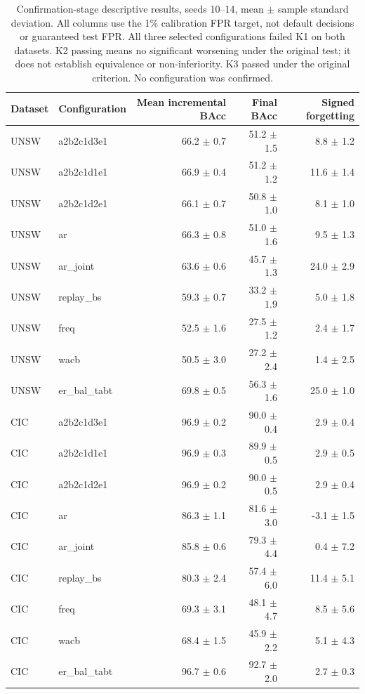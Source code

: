 \begin{table}[p]\centering\scriptsize
\caption{Confirmation-stage descriptive results, seeds 10--14, mean $\pm$ sample standard deviation. All columns use the 1\% calibration FPR target, not default decisions or guaranteed test FPR. All three selected configurations failed K1 on both datasets. K2 passing means no significant worsening under the original test; it does not establish equivalence or non-inferiority. K3 passed under the original criterion. No configuration was confirmed.}
\label{tab:design-space-confirm}
\begin{tabular}{llrrr}\toprule
Dataset & Configuration & Mean incremental BAcc & Final BAcc & Signed forgetting \\\midrule
UNSW & a2b2c1d3e1 & 66.2 $\pm$ 0.7 & 51.2 $\pm$ 1.5 & 8.8 $\pm$ 1.2 \\
UNSW & a2b2c1d1e1 & 66.9 $\pm$ 0.4 & 51.2 $\pm$ 1.2 & 11.6 $\pm$ 1.4 \\
UNSW & a2b2c1d2e1 & 66.1 $\pm$ 0.7 & 50.8 $\pm$ 1.0 & 8.1 $\pm$ 1.0 \\
UNSW & ar & 66.3 $\pm$ 0.8 & 51.0 $\pm$ 1.6 & 9.5 $\pm$ 1.3 \\
UNSW & ar\_joint & 63.6 $\pm$ 0.6 & 45.7 $\pm$ 1.3 & 24.0 $\pm$ 2.9 \\
UNSW & replay\_bs & 59.3 $\pm$ 0.7 & 33.2 $\pm$ 1.9 & 5.0 $\pm$ 1.8 \\
UNSW & freq & 52.5 $\pm$ 1.6 & 27.5 $\pm$ 1.2 & 2.4 $\pm$ 1.7 \\
UNSW & wacb & 50.5 $\pm$ 3.0 & 27.2 $\pm$ 2.4 & 1.4 $\pm$ 2.5 \\
UNSW & er\_bal\_tabt & 69.8 $\pm$ 0.5 & 56.3 $\pm$ 1.6 & 25.0 $\pm$ 1.0 \\
CIC & a2b2c1d3e1 & 96.9 $\pm$ 0.2 & 90.0 $\pm$ 0.4 & 2.9 $\pm$ 0.4 \\
CIC & a2b2c1d1e1 & 96.9 $\pm$ 0.3 & 89.9 $\pm$ 0.5 & 2.9 $\pm$ 0.5 \\
CIC & a2b2c1d2e1 & 96.9 $\pm$ 0.2 & 90.0 $\pm$ 0.5 & 2.9 $\pm$ 0.4 \\
CIC & ar & 86.3 $\pm$ 1.1 & 81.6 $\pm$ 3.0 & -3.1 $\pm$ 1.5 \\
CIC & ar\_joint & 85.8 $\pm$ 0.6 & 79.3 $\pm$ 4.4 & 0.4 $\pm$ 7.2 \\
CIC & replay\_bs & 80.3 $\pm$ 2.4 & 57.4 $\pm$ 6.0 & 11.4 $\pm$ 5.1 \\
CIC & freq & 69.3 $\pm$ 3.1 & 48.1 $\pm$ 4.7 & 8.5 $\pm$ 5.6 \\
CIC & wacb & 68.4 $\pm$ 1.5 & 45.9 $\pm$ 2.2 & 5.1 $\pm$ 4.3 \\
CIC & er\_bal\_tabt & 96.7 $\pm$ 0.6 & 92.7 $\pm$ 2.0 & 2.7 $\pm$ 0.3 \\
\bottomrule\end{tabular}\end{table}
